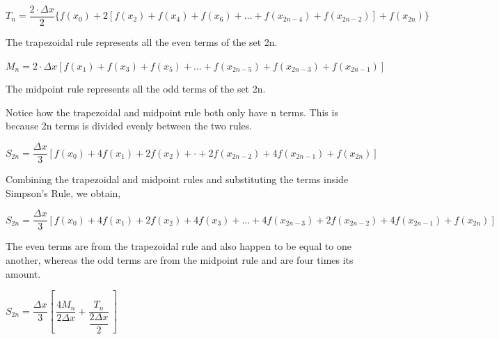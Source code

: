 \documentclass[letterpaper,12pt]{article}
\theoremstyle{definition}
\begin{document}
\vspace{1cm}

\begin{center}
\end{center}

\vspace{1cm}

$T_n=\dfrac{2\cdot\Delta x}{2}\{f(x_0)+2[f(x_2)+f(x_4)+f(x_6)+\ldots +f(x_{2n-4})+f(x_{2n-2})]+f(x_{2n})\}$

\vspace{0.5cm}

The trapezoidal rule represents all the even terms of the set 2n.

\vspace{1cm}

$M_n=2\cdot \Delta x[f(x_1)+f(x_3)+f(x_5)+\ldots +f(x_{2n-5})+f(x_{2n-3})+f(x_{2n-1})]$

\vspace{0.5cm}

The midpoint rule represents all the odd terms of the set 2n.

\vspace{0.5cm}

Notice how the trapezoidal and midpoint rule both only have n terms. This is because 2n terms is divided evenly between the two rules.

\vspace{1cm}

$S_{2n}=\dfrac{\Delta x}{3}[f(x_0)+4f(x_1)+2f(x_2)+\cdot +2f(x_{2n-2})+4f(x_{2n-1})+f(x_{2n})]$

\vspace{0.5cm}

Combining the trapezoidal and midpoint rules and substituting the terms inside Simpson's Rule, we obtain,

\vspace{1cm}

$S_{2n}=\dfrac{\Delta x}{3}[f(x_0)+4f(x_1)+2f(x_2)+4f(x_3)+\ldots +4f(x_{2n-3})+2f(x_{2n-2})+4f(x_{2n-1})+f(x_{2n})]$

\vspace{0.5cm}

The even terms are from the trapezoidal rule and also happen to be equal to one another, whereas the odd terms are from the midpoint rule and are four times its amount.

\vspace{1cm}

\pagebreak

$S_{2n}=\dfrac{\Delta x}{3}[\, \dfrac{4M_n}{2\Delta x}+\dfrac{T_n}{\dfrac{2\Delta x}{2}}\, ]$
\end{document}
